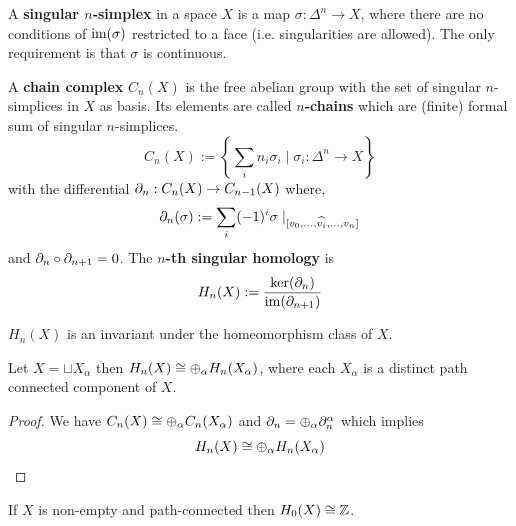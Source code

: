 \documentclass[12pt]{amsart}
\begin{document}
\begin{definition}
    A \textbf{singular $n$-simplex} in a space $X$ is a map $\sigma: \Delta^n \to X$, where there are no conditions of $\operatorname{im}(\sigma)$ restricted to a face (i.e. singularities are allowed). The only requirement is that $\sigma$ is continuous. 
\end{definition}

\begin{definition}
    A \textbf{chain complex} $C_n(X)$ is the free abelian group with the set of singular $n$-simplices in $X$ as basis. Its elements are called \textbf{$n$-chains} which are (finite) formal sum of singular $n$-simplices. 
    \[C_n(X) := \left \{\sum_i n_i \sigma_i \mid \sigma_i : \Delta^n \to X\right \}\]
    with the differential $\partial_n : C_n(X) \to C_{n-1}(X)$ where, 
    \[\partial_n(\sigma):= \sum_i (-1)^i \sigma \mid_{[v_0, \ldots, \widehat{v_i}, \ldots, v_n]}\]
     and $\partial_n \circ \partial_{n+1} = 0$. The \textbf{$n$-th singular homology} is \[H_n(X) := \frac{\ker(\partial_n)}{\operatorname{im}(\partial_{n+1})}\]
\end{definition}

\begin{remark}
    $H_n(X)$ is an invariant under the homeomorphism class of $X$. 
\end{remark}

\begin{proposition}
    Let $X = \sqcup X_\alpha$ then $H_n(X) \cong \oplus_\alpha H_n(X_\alpha)$, where each $X_\alpha$ is a distinct path connected component of $X$. 
\end{proposition}

\begin{proof}
    We have $C_n(X) \cong \oplus_\alpha C_n(X_\alpha)$ and $\partial_n = \oplus_\alpha \partial_n^\alpha$ which implies 
    \[H_n(X) \cong \oplus_\alpha H_n(X_\alpha)\]
\end{proof}

\begin{proposition}
    If $X$ is non-empty and path-connected then $H_0(X) \cong \mathbb Z$. 
\end{proposition}
\end{document}
